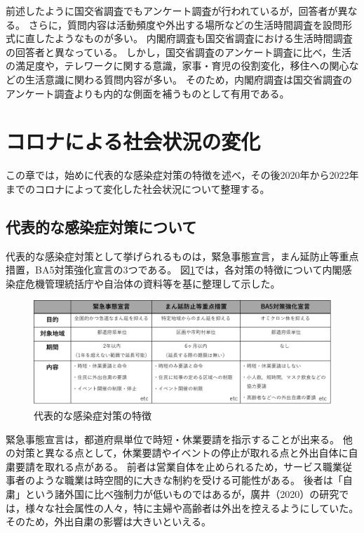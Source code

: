 \documentclass[paper={210mm,297mm},fontsize=15Q,line_length=35zw,number_of_lines=31,head_space=30mm,gutter=40mm,baselineskip=2.0zw,headfoot_verticalposition=1.5zw]{jlreq}
\begin{document}
前述したように国交省調査でもアンケート調査が行われているが，回答者が異なる。
さらに，質問内容は活動頻度や外出する場所などの生活時間調査を設問形式に直したようなものが多い。
内閣府調査も国交省調査における生活時間調査の回答者と異なっている。
しかし，国交省調査のアンケート調査に比べ，生活の満足度や，テレワークに関する意識，家事・育児の役割変化，移住への関心などの生活意識に関わる質問内容が多い。
そのため，内閣府調査は国交省調査のアンケート調査よりも内的な側面を補うものとして有用である。

\section{コロナによる社会状況の変化}

この章では，始めに代表的な感染症対策の特徴を述べ，その後2020年から2022年までのコロナによって変化した社会状況について整理する。

\subsection{代表的な感染症対策について}

代表的な感染症対策として挙げられるものは，緊急事態宣言，まん延防止等重点措置，BA5対策強化宣言の3つである。
図\ref{代表的な感染症対策の特徴}では，各対策の特徴について内閣感染症危機管理統括庁や自治体の資料等を基に整理して示した。

\begin{figure}[H]
  \centering
  \includegraphics[width=120mm]{../Figure/c03s01_fig_各感染症対策の違い.png}
  \caption{代表的な感染症対策の特徴}
  \label{代表的な感染症対策の特徴}
\end{figure}

緊急事態宣言は，都道府県単位で時短・休業要請を指示することが出来る。
他の対策と異なる点として，休業要請やイベントの停止が取れる点と外出自体に自粛要請を取れる点がある。
前者は営業自体を止められるため，サービス職業従事者のような職業は時空間的に大きな制約を受ける可能性がある。
後者は「自粛」という諸外国に比べ強制力が低いものではあるが，廣井（2020）の研究では，様々な社会属性の人々，特に主婦や高齢者は外出を控えるようにしていた。
そのため，外出自粛の影響は大きいといえる。
\end{document}
